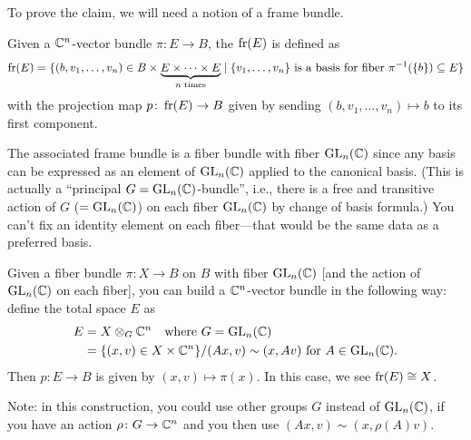 \begin{node}
To prove the claim, we will need a notion of a frame bundle.
\end{node}

\begin{definition}
Given a $\mathbb{C}^{n}$-vector bundle $\pi\colon E\to B$, the
 $\operatorname{fr}(E)$ is defined as
\begin{equation}
\operatorname{fr}(E)=\{(b,v_{1},\dots,v_{n})\in
B\times\underbrace{E\times\cdots\times E}_{n\text{ times}}\mid
\{v_{1},\dots,v_{n}\}\mbox{ is a basis for fiber }
\pi^{-1}(\{b\})\subseteq E\}
\end{equation}
with the projection map $p\colon\operatorname{fr}(E)\to B$ given by
sending $(b,v_{1},\dots,v_{n})\mapsto b$ to its first component.
\end{definition}

\begin{remark}
The associated frame bundle is a fiber bundle with fiber
$\operatorname{GL}_{n}(\mathbb{C})$ since any basis can be expressed as an element of
$\operatorname{GL}_{n}(\mathbb{C})$ applied to the canonical basis. (This is actually a
``principal $G=\operatorname{GL}_{n}(\mathbb{C})$-bundle'', i.e., there is a free and
transitive action of $G$ ($=\operatorname{GL}_{n}(\mathbb{C})$) on each fiber $\operatorname{GL}_{n}(\mathbb{C})$
by change of basis formula.) You can't fix an identity element on each
fiber---that would be the same data as a preferred basis.
\end{remark}

\begin{construction}
Given a fiber bundle $\pi\colon X\to B$ on $B$ with fiber $\operatorname{GL}_{n}(\mathbb{C})$ [and the
action of $\operatorname{GL}_{n}(\mathbb{C})$ on each fiber], you can build a
$\mathbb{C}^{n}$-vector bundle in the following way: define the total space
$E$ as
\begin{subequations}
  \begin{align}
E &= X\otimes_{G}\mathbb{C}^{n}\quad\mbox{where }G=\operatorname{GL}_{n}(\mathbb{C})\\
&=\{(x,v)\in X\times\mathbb{C}^{n}\}/(Ax,v)\sim(x,Av)\mbox{ for }A\in\operatorname{GL}_{n}(\mathbb{C}).
  \end{align}
\end{subequations}
Then $p\colon E\to B$ is given by $(x,v)\mapsto\pi(x)$. In this case,
we see $\operatorname{fr}(E)\cong X$.
\end{construction}

\begin{remark}
Note: in this construction, you could use other groups $G$ instead of
$\operatorname{GL}_{n}(\mathbb{C})$, if you have an action $\rho\colon G\to\mathbb{C}^{n}$ and you
then use $(Ax,v)\sim(x,\rho(A)v)$.
\end{remark}

